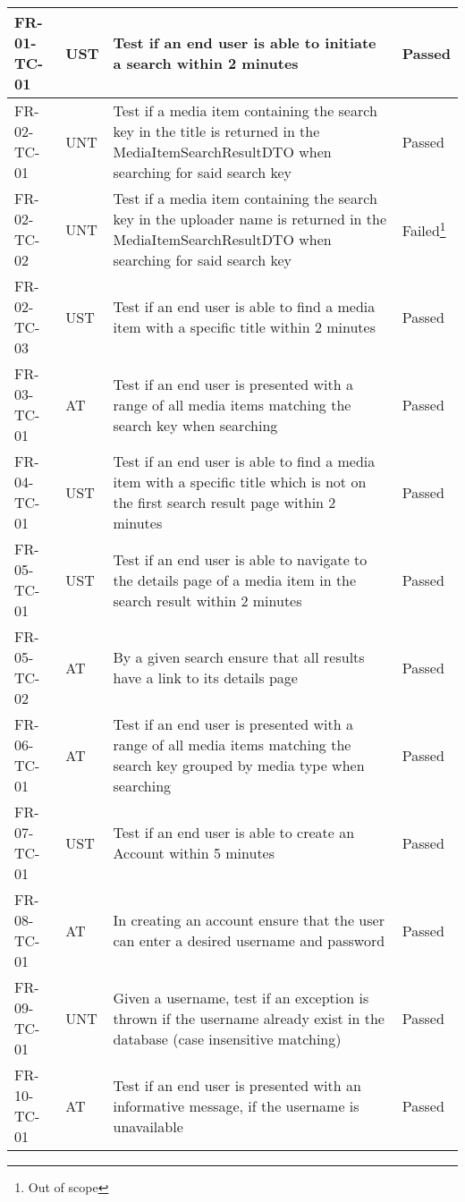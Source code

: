 \documentclass[../report.tex]{subfiles}
\begin{document}
\begin{longtable}{|L{2.1cm}|L{1cm}|L{12.4cm}|L{1.4cm}|}
FR-01-TC-01 & UST & Test if an end user is able to initiate a search within 2 minutes & Passed  \\ \hline
FR-02-TC-01& UNT& Test if a media item containing the search key in the title is returned in the MediaItemSearchResultDTO when searching for said search key& Passed  \\ \hline
FR-02-TC-02& UNT& Test if a media item containing the search key in the uploader name is returned in the MediaItemSearchResultDTO when searching for said search key& Failed\footnote{Out of scope}  \\ \hline
FR-02-TC-03&UST&Test if an end user is able to find a media item with a specific title within 2 minutes&Passed  \\ \hline
FR-03-TC-01&AT&Test if an end user is presented with a range of all media items matching the search key when searching &Passed  \\ \hline
FR-04-TC-01&UST&Test if an end user is able to find a media item with a specific title which is not on the first search result page within 2 minutes&Passed  \\ \hline
FR-05-TC-01&UST&Test if an end user is able to navigate to the details page of a media item in the search result within 2 minutes&Passed  \\ \hline
FR-05-TC-02&AT&By a given search ensure that all results have a link to its details page&Passed  \\ \hline
FR-06-TC-01&AT&Test if an end user is presented with a range of all media items matching the search key grouped by media type when searching &Passed  \\ \hline
FR-07-TC-01&UST&Test if an end user is able to create an Account within 5 minutes&Passed  \\ \hline
FR-08-TC-01&AT&In creating an account ensure that the user can enter a desired username and password&Passed  \\ \hline
FR-09-TC-01&UNT&Given a username, test if an exception is thrown if the username already exist in the database (case insensitive matching)&Passed  \\ \hline
FR-10-TC-01&AT&Test if an end user is presented with an informative message, if the username is unavailable&Passed  \\ \hline

\end{longtable}
\end{document}
